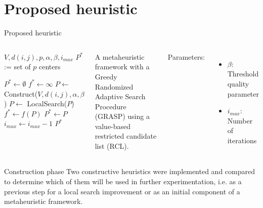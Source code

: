 \documentclass{beamer}
\begin{document}
\section{Proposed heuristic}

\begin{frame}{Proposed heuristic}
    \begin{columns}
        \begin{algorithmic}[1]
        
        \REQUIRE $V, d(i, j), p, \alpha, \beta, i_{max}$
        \ENSURE $P^*$ := set of $p$ centers
        
        \STATE $P^* \gets \emptyset$
        \STATE $f^* \gets \infty$
            \STATE $P \gets$ Construct($V, d(i,j), \alpha, \beta$)
            \STATE $P \gets$ LocalSearch($P$)
                \STATE $f^* \gets f(P)$
                \STATE $P^* \gets P$ 
            \ENDIF
            \STATE $i_{max} \gets i_{max} - 1$
        \ENDWHILE
        \RETURN $P^*$
        
        \end{algorithmic}
        
        A metaheuristic framework with a Greedy Randomized Adaptive Search Procedure (GRASP) using a value-based restricted candidate list (RCL).
        
        Parameters:
        \begin{itemize}
            \item $\beta$: Threshold quality parameter
            \item $i_{max}$: Number of iterations
        \end{itemize}
    \end{columns}
\end{frame}

\begin{frame}{Construction phase}
     Two constructive heuristics were implemented and compared to determine which of them will be used in further experimentation, i.e. as a previous step for a local search improvement or as an initial component of a metaheuristic framework.
\end{frame}
\end{document}
